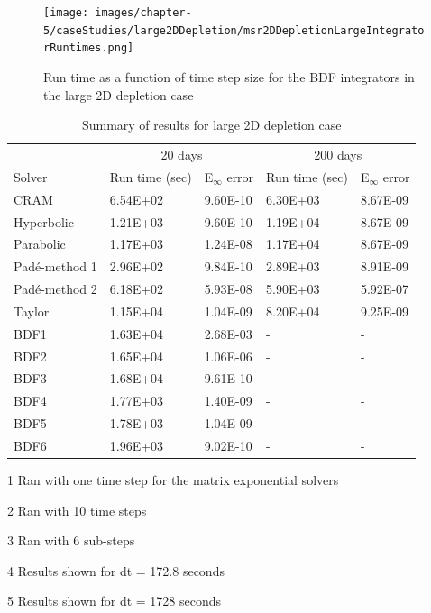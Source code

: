\clearpage

\begin{figure}[p]
    \centering
    \texttt{[image: images/chapter-5/caseStudies/large2DDepletion/msr2DDepletionLargeIntegratorRuntimes.png]}
    \caption{Run time as a function of time step size for the BDF integrators in the large 2D depletion case}
    \label{fig:large_2D_depletion_integrator_runtimes}
\end{figure}

\clearpage

\begin{table}[p]
\centering
\begin{threeparttable}
   \caption{\label{tab:large_2D_depletion_runtimes} Summary of results for large 2D depletion case}
   \begin{tabular}{lllll}
   \hline
   \multicolumn{1}{c}{} & \multicolumn{2}{c}{20 days\tnote{1}} & \multicolumn{2}{c}{200 days\tnote{2}} \\
   \cline{2-5} 
   Solver & Run time (sec) & E$_{\infty}$ error & Run time (sec) & E$_{\infty}$ error \\
   \hline
   CRAM\tnote{3} & 6.54E+02 & 9.60E-10 & 6.30E+03 & 8.67E-09 \\
   Hyperbolic\tnote{3} & 1.21E+03 & 9.60E-10 & 1.19E+04 & 8.67E-09 \\
   Parabolic\tnote{3} & 1.17E+03 & 1.24E-08 & 1.17E+04 & 8.67E-09 \\
   Pad\'e-method 1 & 2.96E+02 & 9.84E-10 & 2.89E+03 & 8.91E-09 \\
   Pad\'e-method 2 & 6.18E+02 & 5.93E-08 & 5.90E+03 & 5.92E-07 \\
   Taylor & 1.15E+04 & 1.04E-09 & 8.20E+04 & 9.25E-09 \\
   BDF1\tnote{4} & 1.63E+04 & 2.68E-03 & - & - \\
   BDF2\tnote{4} & 1.65E+04 & 1.06E-06 & - & - \\
   BDF3\tnote{4} & 1.68E+04 & 9.61E-10 & - & - \\
   BDF4\tnote{5} & 1.77E+03 & 1.40E-09 & - & - \\
   BDF5\tnote{5} & 1.78E+03 & 1.04E-09 & - & - \\
   BDF6\tnote{5} & 1.96E+03 & 9.02E-10 & - & - \\
   \hline
   \end{tabular}
	\begin{tablenotes}
      \small
      \item [1] Ran with one time step for the matrix exponential solvers
      \item [2] Ran with 10 time steps
      \item [3] Ran with 6 sub-steps
      \item [4] Results shown for dt = 172.8 seconds
      \item [5] Results shown for dt = 1728 seconds
    \end{tablenotes}
\end{threeparttable}
\end{table} 

